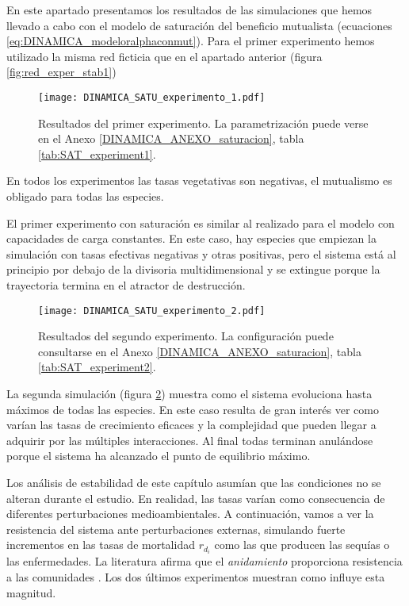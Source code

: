 En este apartado presentamos los resultados de las simulaciones que hemos llevado a cabo con el modelo de saturación del beneficio mutualista (ecuaciones \ref{eq:DINAMICA_modeloralphaconmut}). Para el primer experimento hemos utilizado la misma red ficticia que en el apartado anterior (figura \ref{fig:red_exper_stab1})

\begin{figure}[b!]
\centering
\texttt{[image: DINAMICA\_SATU\_experimento\_1.pdf]}
\caption {Resultados del primer experimento. La parametrización puede verse en el Anexo \ref{DINAMICA_ANEXO_saturacion}, tabla \ref{tab:SAT_experiment1}.}
\label{fig:DINAMICA_SAT_exper_stab1}
\end{figure}

En todos los experimentos las tasas vegetativas son negativas, el mutualismo es obligado para todas las especies.

El primer experimento con saturación es similar al realizado para el modelo con capacidades de carga constantes. En este caso, hay especies que empiezan la simulación con tasas efectivas negativas y otras positivas, pero el sistema está al principio por debajo de la divisoria multidimensional y se extingue porque la trayectoria termina en el atractor de destrucción.

\begin{figure}[h!]
\centering
\texttt{[image: DINAMICA\_SATU\_experimento\_2.pdf]}
\caption {Resultados del segundo experimento. La configuración puede consultarse en el Anexo  \ref{DINAMICA_ANEXO_saturacion}, tabla \ref{tab:SAT_experiment2}.}
\label{fig:DINAMICA_SAT_exper_stab2}
\end{figure}

La segunda simulación (figura \ref{fig:DINAMICA_SAT_exper_stab2}) muestra como el sistema evoluciona hasta máximos de todas las especies. En este caso resulta de gran interés ver como varían las tasas de crecimiento eficaces y la complejidad que pueden llegar a adquirir por las múltiples interacciones. Al final todas terminan anulándose porque el sistema ha alcanzado el punto de equilibrio máximo. 

Los análisis de estabilidad de este capítulo asumían que las condiciones no se alteran durante el estudio. En realidad, las tasas varían como consecuencia de diferentes perturbaciones medioambientales. A continuación, vamos a ver la resistencia del sistema ante perturbaciones externas, simulando fuerte incrementos en las tasas de mortalidad $r_{d_i}$ como las que producen las sequías o las enfermedades. La literatura afirma que el \emph{anidamiento} proporciona resistencia a las comunidades \citep{bascompte2003nested}. Los dos últimos experimentos muestran como influye esta magnitud.

